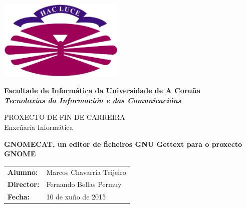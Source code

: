 %
%

%

\begin{titlepage}

	\begin{center}

		\includegraphics[width=6cm]{./eps/logo_udc.eps}
		\vspace{2cm}

		{\Large{\textbf{Facultade de Informática da Universidade de A Coruña}}}
		\\
		{\it \large{\textbf{Tecnoloxías da Información e das Comunicacións}}}
		\vspace{1cm}

		{\large PROXECTO DE FIN DE CARREIRA\\Enxeñaría Informática}
		\vspace{1cm}

		\textbf{\Large GNOMECAT, un editor de ficheiros GNU Gettext para o proxecto GNOME}
		\vspace{7cm}
	\end{center}

	\begin{flushright}
		\begin{tabular}{ll}
			\large{\textbf{Alumno:}}	&
			\large{Marcos Chavarría Teijeiro} \\

			\large{\textbf{Director:}}	&
			\large{Fernando Bellas Permuy} \\

			\large{\textbf{Fecha:}}	&
			\large{10 de xuño de 2015} \\
		\end{tabular}
	\end{flushright}

\end{titlepage}
